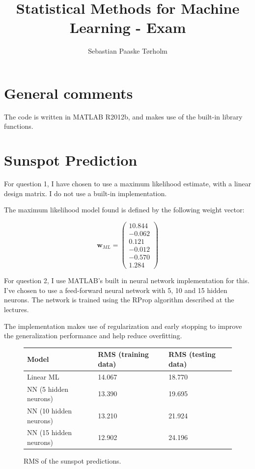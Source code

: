 \documentclass[11pt,a4paper]{article}
\title{Statistical Methods for Machine Learning - Exam}
\author{Sebastian Paaske Tørholm}
\begin{document}
\maketitle

\section{General comments}
The code is written in MATLAB R2012b, and makes use of the built-in library functions.

\section{Sunspot Prediction}
For question 1, I have chosen to use a maximum likelihood estimate, with a
linear design matrix. I do not use a built-in implementation.

The maximum likelihood model found is defined by the following weight vector:

\[
    \mathbf{w}_{ML} = \begin{pmatrix} 10.844 \\ -0.062 \\ 0.121 \\ -0.012 \\ -0.570 \\ 1.284 \end{pmatrix}
\]


For question 2, I use MATLAB's built in neural network implementation for
this. I've chosen to use a feed-forward neural network with 5, 10 and 15
hidden neurons. The network is trained using the RProp algorithm described at
the lectures.

The implementation makes use of regularization and early stopping to improve
the generalization performance and help reduce overfitting.

\begin{figure}[h!]
    \centering
    \begin{tabular}{|l|l|l|}
        \hline
        Model & RMS (training data) & RMS (testing data) \\
        \hline
        Linear ML & 14.067 & 18.770 \\
        NN (5 hidden neurons) & 13.390 & 19.695 \\
        NN (10 hidden neurons) & 13.210 & 21.924 \\
        NN (15 hidden neurons) & 12.902 & 24.196 \\ 
        \hline
    \end{tabular}
    \label{sunspots-rms}
    \caption{RMS of the sunspot predictions.}
\end{figure}
\end{document}
